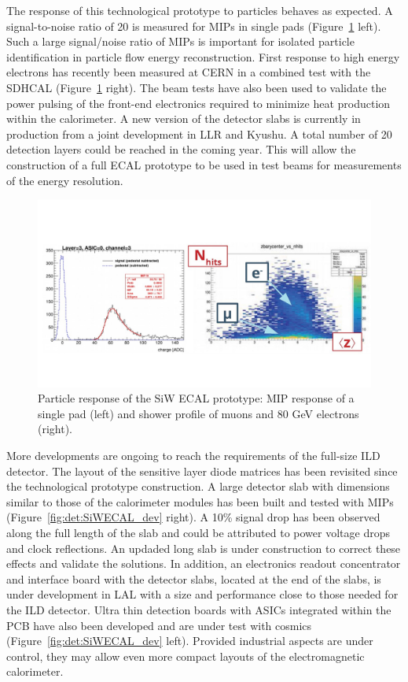 The response of this technological prototype to particles behaves as expected. A signal-to-noise ratio of 20 is measured for MIPs in single pads (Figure~\ref{fig:det:SiWECAL_signals} left). Such a large signal/noise ratio of MIPs is important for isolated particle identification in particle flow energy reconstruction. First response to high energy electrons has recently been measured at CERN in a combined test with the SDHCAL (Figure~\ref{fig:det:SiWECAL_signals} right). The beam tests have also been used to validate the power pulsing of the front-end electronics required to minimize heat production within the calorimeter. A new version of the detector slabs is currently in production from a joint development in LLR and Kyushu. A total number of 20 detection layers could be reached in the coming year. This will allow the construction of a full ECAL prototype to be used in test beams for measurements of the energy resolution.

\begin{figure}[t!]
\centering
\includegraphics[width=1.0\hsize]{Detector/fig/SiWECAL_signals.jpg}
\caption{Particle response of the SiW ECAL prototype: MIP response of a single pad (left) and shower profile of muons and 80 GeV electrons (right).}
\label{fig:det:SiWECAL_signals}
\end{figure}

More developments are ongoing to reach the requirements of the full-size ILD detector. The layout of the sensitive layer diode matrices has been revisited since the technological prototype construction. A large detector slab with dimensions similar to those of the calorimeter modules has been built and tested with MIPs (Figure~\ref{fig:det:SiWECAL_dev} right). A 10\% signal drop has been observed along the full length of the slab and could be attributed to power voltage drops and clock reflections. An updaded long slab is under construction to correct these effects and validate the solutions. In addition, an electronics readout concentrator and interface board with the detector slabs, located at the end of the slabs, is under development in LAL with a size and performance close to those needed for the ILD detector. Ultra thin detection boards with ASICs integrated within the PCB have also been developed and are under test with cosmics (Figure~\ref{fig:det:SiWECAL_dev} left). Provided industrial aspects are under control, they may allow even more compact layouts of the electromagnetic calorimeter. 

